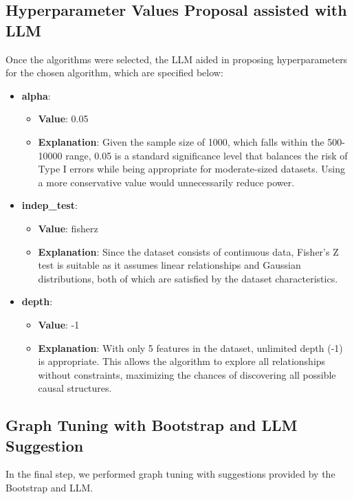 \documentclass{article}
\begin{document}
\subsection{Hyperparameter Values Proposal assisted with LLM}
Once the algorithms were selected, the LLM aided in proposing hyperparameters for the chosen algorithm, which are specified below:
        
\begin{itemize}
    \item \textbf{alpha}:
    \begin{itemize}
        \item \textbf{Value}: 0.05
        \item \textbf{Explanation}: Given the sample size of 1000, which falls within the 500-10000 range, 0.05 is a standard significance level that balances the risk of Type I errors while being appropriate for moderate-sized datasets. Using a more conservative value would unnecessarily reduce power.
    \end{itemize}

    \item \textbf{indep\_test}:
    \begin{itemize}
        \item \textbf{Value}: fisherz
        \item \textbf{Explanation}: Since the dataset consists of continuous data, Fisher's Z test is suitable as it assumes linear relationships and Gaussian distributions, both of which are satisfied by the dataset characteristics.
    \end{itemize}

    \item \textbf{depth}:
    \begin{itemize}
        \item \textbf{Value}: -1
        \item \textbf{Explanation}: With only 5 features in the dataset, unlimited depth (-1) is appropriate. This allows the algorithm to explore all relationships without constraints, maximizing the chances of discovering all possible causal structures.
    \end{itemize}
\end{itemize}

\subsection{Graph Tuning with Bootstrap and LLM Suggestion}
In the final step, we performed graph tuning with suggestions provided by the Bootstrap and LLM.
\end{document}
